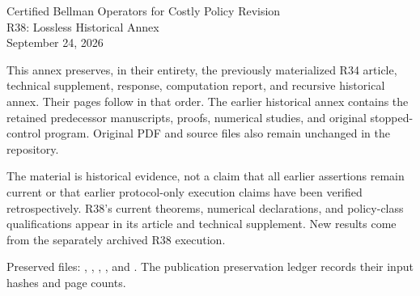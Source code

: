 \documentclass[11pt]{article}
\begin{document}
\begin{center}\Large Certified Bellman Operators for Costly Policy Revision\\[1em]
\large R38: Lossless Historical Annex\\[1em]\normalsize September 24, 2026\end{center}
This annex preserves, in their entirety, the previously materialized R34 article, technical supplement, response, computation report, and recursive historical annex. Their pages follow in that order. The earlier historical annex contains the retained predecessor manuscripts, proofs, numerical studies, and original stopped-control program. Original PDF and source files also remain unchanged in the repository.

The material is historical evidence, not a claim that all earlier assertions remain current or that earlier protocol-only execution claims have been verified retrospectively. R38's current theorems, numerical declarations, and policy-class qualifications appear in its article and technical supplement. New results come from the separately archived R38 execution.

\bigskip
\noindent Preserved files: , ,
, , and
.
The publication preservation ledger records their input hashes and page counts.





\end{document}
